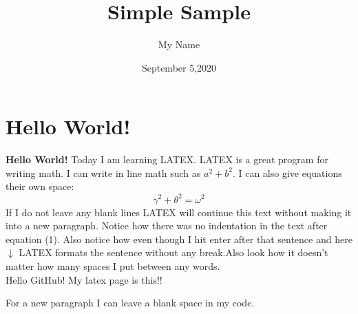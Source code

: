 \documentclass[10 pt]{article}
\begin{document}
\title{Simple Sample}
\author{My Name}
\date{September 5,2020}
\maketitle
\section{Hello World!}
\textbf{Hello World!}
Today I am learning {\Large L}A{\Large T}E{\Large X}. LATEX is a great program for writing math. I can write in line math such as $a^2+b^2$. I can also give equations their own space:
\begin{equation}
\gamma^2+\theta^2=\omega^2
\end{equation}
If I do not leave any blank lines LATEX will continue this text without making it into a new paragraph. Notice how there was no indentation in the text after equation (1). Also notice how even though I hit enter after that sentence and here $\downarrow$ LATEX formats the sentence without any break.Also look how it doesn't
matter how many spaces I put between any words. \\ 
Hello GitHub! My latex page is this!!

For a new paragraph I can leave a blank space in my code.
\end{document}
